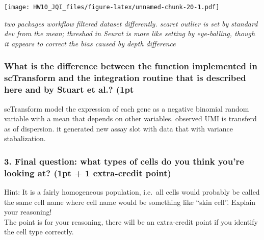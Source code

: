 \documentclass[]{article}
\begin{document}
\texttt{[image: HW10\_JQI\_files/figure-latex/unnamed-chunk-20-1.pdf]}

\emph{two packages workflow filtered dataset differently. scaret outlier
is set by standard dev from the mean; threshod in Seurat is more like
setting by eye-balling, though it appears to correct the bias caused by
depth difference}

\subsubsection{What is the difference between the function implemented
in scTransform and the integration routine that is described here and by
Stuart et al.?
(1pt}\label{what-is-the-difference-between-the-function-implemented-in-sctransform-and-the-integration-routine-that-is-described-here-and-by-stuart-et-al.-1pt}

scTransform model the expression of each gene as a negative binomial
random variable with a mean that depends on other variables. observed
UMI is transferd as of dispersion. it generated new assay slot with data
that with variance stabalization.

\subsubsection{3. Final question: what types of cells do you think
you're looking at? (1pt + 1 extra-credit
point)}\label{final-question-what-types-of-cells-do-you-think-youre-looking-at-1pt-1-extra-credit-point}

Hint: It is a fairly homogeneous population, i.e.~all cells would
probably be called the same cell name where cell name would be something
like ``skin cell''. Explain your reasoning!\\
The point is for your reasoning, there will be an extra-credit point if
you identify the cell type correctly.
\end{document}
